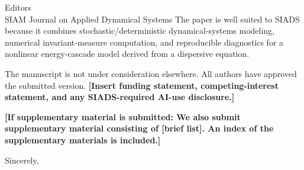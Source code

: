 \documentclass[11pt]{letter}
\begin{document}
\begin{letter}{Editors\\SIAM Journal on Applied Dynamical Systems}
The paper is well suited to SIADS because it combines
stochastic/deterministic dynamical-systems modeling, numerical
invariant-measure computation, and reproducible diagnostics for a nonlinear
energy-cascade model derived from a dispersive equation.

The manuscript is not under consideration elsewhere.  All authors have
approved the submitted version.  \textbf{[Insert funding statement,
competing-interest statement, and any SIADS-required AI-use disclosure.]}

\textbf{[If supplementary material is submitted: We also submit supplementary
material consisting of [brief list].  An index of the supplementary materials
is included.]}

\closing{Sincerely,}

\end{letter}
\end{document}
